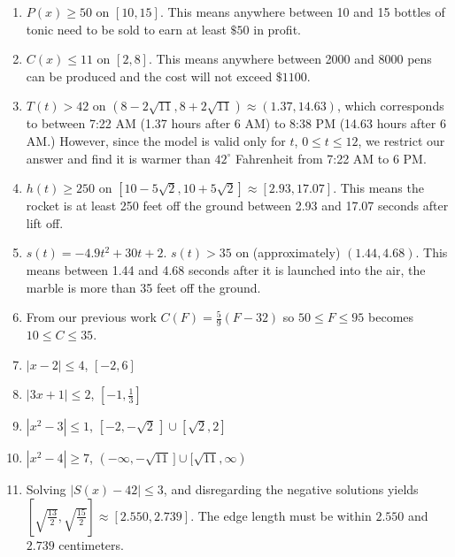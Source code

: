 \begin{enumerate}
\setcounter{enumi}{\value{HW}}

\item  $P(x) \geq 50$ on $[10,15]$.  This means anywhere between 10 and 15 bottles of tonic need to be sold to earn at least $\$50$ in profit.  

\item  $C(x) \leq 11$ on $[2,8]$.  This means anywhere between 2000 and 8000 pens can be produced and the cost will not exceed $\$1100$.

\item  $T(t) > 42$ on  $(8-2\sqrt{11}, 8+2\sqrt{11}) \approx (1.37, 14.63)$, which corresponds to between 7:22 AM (1.37 hours after 6 AM) to 8:38 PM (14.63 hours after 6 AM.)  However, since the model is valid only for $t$, $0 \leq t \leq 12$, we restrict our answer and find it is warmer than $42^{\circ}$ Fahrenheit from 7:22 AM to 6 PM. 

\item $h(t) \geq 250$ on $[10-5\sqrt{2}, 10+5\sqrt{2}] \approx [2.93, 17.07]$.  This means the rocket is at least 250 feet off the ground between 2.93 and 17.07 seconds after lift off.


\item $s(t) = -4.9t^2 + 30t + 2$.  $s(t) > 35$ on (approximately)  $(1.44, 4.68)$.  This means between 1.44 and 4.68 seconds after it is launched into the air, the marble is more than 35 feet off the ground.

\item From our previous work $C(F) = \frac{5}{9}(F - 32)$ so $50 \leq F \leq 95$ becomes $10 \leq C \leq 35$.

\item $|x-2| \leq 4$, $[-2,6]$

\item $|3x+1| \leq 2$, $\left[-1, \frac{1}{3}\right]$ 

\item $|x^2-3| \leq 1$, $[-2, -\sqrt{2} \,] \cup [\sqrt{2}, 2]$ 

\item $|x^2 -4| \geq 7$, $(-\infty, -\sqrt{11} \,] \cup [\sqrt{11}, \infty)$


\item Solving $|S(x) - 42| \leq 3$, and disregarding the negative solutions yields $\left[\sqrt{\frac{13}{2}}, \sqrt{\frac{15}{2}}\right] \approx [2.550, 2.739]$.  The edge length must be within $2.550$ and $2.739$ centimeters.

\setcounter{HW}{\value{enumi}}
\end{enumerate}

